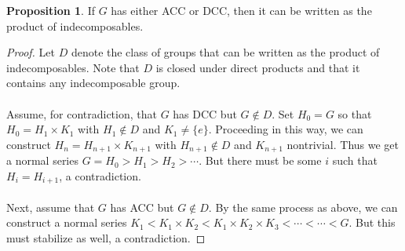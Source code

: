 \documentclass[10pt,letterpaper,cm]{nupset}
\theoremstyle{definition}
\theoremstyle{theorem}
\newtheorem{prop}[definition]{Proposition}
\theoremstyle{remark}
\newcommand{\1}{\mathbf{1}}
\newcommand{\0}{\vec 0}
\begin{document}
\begin{prop}\label{lp}
If $G$ has either ACC or DCC, then it can be written as the product of indecomposables.
\end{prop}
\begin{proof}
Let $D$ denote the class of groups that can be written as the product of indecomposables. Note that $D$ is closed under direct products and that it contains any indecomposable group. \\ \\ Assume, for contradiction, that $G$ has DCC but $G \notin D$. Set $H_0 = G$ so that $H_0 = H_1 \times K_1$ with $H_1 \notin D$ and $K_1 \ne \{e\}$. Proceeding in this way, we can construct $H_n = H_{n+1} \times K_{n+1}$ with $H_{n+1} \notin D$ and $K_{n+1}$ nontrivial. Thus we get a normal series $G= H_0 > H_1 > H_2 > \cdots$. But there must be some $i$ such that $H_i = H_{i+1}$, a contradiction.
\\ \\ Next, assume that $G$ has ACC but $G \notin D$. By the same process as above, we can construct a normal series $K_1 < K_1 \times K_2 < K_1 \times K_2 \times K_3 < \cdots < \cdots < G$. But this must stabilize as well, a contradiction.
\end{proof}
\end{document}
